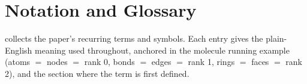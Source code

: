 \section{Notation and Glossary}
\label{app:glossary}

 collects the paper's recurring terms and symbols.
Each entry gives the plain-English meaning used throughout, anchored in
the molecule running example (atoms $=$ nodes $=$ rank 0, bonds $=$
edges $=$ rank 1, rings $=$ faces $=$ rank 2), and the section where
the term is first defined.


